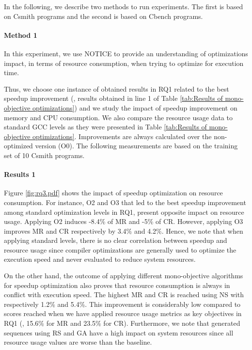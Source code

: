 In the following, we describe two methods to run experiments. The first is based on Csmith programs and the second is based on Cbench programs.

\paragraph{Method 1}

In this experiment, we use NOTICE to provide an understanding of optimizations impact, in terms of resource consumption, when trying to optimize for execution time. 

Thus, we choose one instance of obtained results in RQ1 related to the best speedup improvement (\ie, results obtained in line 1 of Table \ref{tab:Results of mono-objective optimizations}) and we study the impact of speedup improvement on memory and CPU consumption. We also compare the resource usage data to standard GCC levels as they were presented in Table \ref{tab:Results of mono-objective optimizations}. Improvements are always calculated over the non-optimized version (O0). The following measurements are based on the training set of 10 Csmith programs.

\paragraph{Results 1}

Figure \ref{fig:rq3.pdf} shows the impact of speedup optimization on resource consumption. For instance, O2 and O3 that led to the best speedup improvement among standard optimization levels in RQ1, present opposite impact on resource usage. Applying O2 induces -8.4\% of MR and -5\% of CR. However, applying O3 improves MR and CR respectively by 3.4\% and 4.2\%. Hence, we note that when applying standard levels, there is no clear correlation between speedup and resource usage since compiler optimizations are generally used to optimize the execution speed and never evaluated to reduce system resources.

On the other hand, the outcome of applying different mono-objective algorithms for speedup optimization also proves that resource consumption is always in conflict with execution speed. The highest MR and CR is reached using NS with respectively 1.2\% and 5.4\%. This improvement is considerably low compared to scores reached when we have applied resource usage metrics as key objectives in RQ1 (\ie, 15.6\% for MR and 23.5\% for CR). Furthermore, we note that generated sequences using RS and GA have a high impact on system resources since all resource usage values are worse than the baseline.

